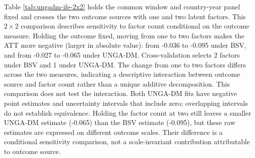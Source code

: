 \documentclass[referee,pdflatex,sn-basic]{sn-jnl}
\renewenvironment{table}[1][]{\tableorg[#1]}{\endtableorg\normalfont}
\theoremstyle{thmstylethree}
\begin{document}
Table \ref{tab:ungadm-ife-2x2} holds the common window and country-year panel fixed and crosses the two outcome sources with one and two latent factors. This \(2\times2\) comparison describes sensitivity to factor count conditional on the outcome measure. Holding the outcome fixed, moving from one to two factors makes the ATT more negative (larger in absolute value): from -0.036 to -0.095 under BSV, and from -0.027 to -0.065 under UNGA-DM. Cross-validation selects 2 factors under BSV and 1 under UNGA-DM. The change from one to two factors differs across the two measures, indicating a descriptive interaction between outcome source and factor count rather than a unique additive decomposition. This comparison does not test the interaction. Both UNGA-DM fits have negative point estimates and uncertainty intervals that include zero; overlapping intervals do not establish equivalence. Holding the factor count at two still leaves a smaller UNGA-DM estimate (-0.065) than the BSV estimate (-0.095), but these raw estimates are expressed on different outcome scales. Their difference is a conditional sensitivity comparison, not a scale-invariant contribution attributable to outcome source.

\begin{table}[H]
\centering
\caption{\label{tab:ungadm-ife-2x2}Outcome source by number of latent factors, holding the panel fixed.}
\centering
{}
\end{table}
\end{document}
